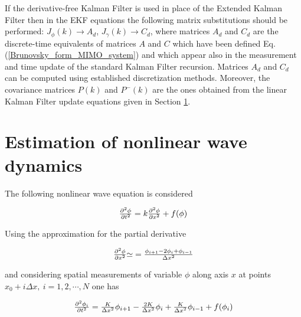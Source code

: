 \documentclass[journal]{IEEEtran}
\begin{document}
\noindent If the derivative-free Kalman Filter is used in place of the Extended Kalman Filter then in the EKF equations the following matrix substitutions should be performed: $J_{\phi}(k){\rightarrow}A_d$, $J_{\gamma}(k){\rightarrow}C_d$, where  matrices $A_d$ and $C_d$ are the discrete-time equivalents of matrices $A$ and $C$ which have been defined Eq. (\ref{Brunovsky_form_MIMO_system}) and which appear also in the measurement and time update of the standard Kalman Filter recursion. Matrices $A_d$ and $C_d$ can be computed using established discretization methods. Moreover, the covariance matrices $P(k)$ and $P^{-}(k)$ are the ones obtained from the linear Kalman Filter update equations given in Section \ref{Section 3: Estimation_of_nonlinear_wave_equations}.\\

\section{Estimation of nonlinear wave dynamics} \label{Section 3: Estimation_of_nonlinear_wave_equations}

\noindent The following nonlinear wave equation is considered

\begin{equation} \label{nonlinear_wave_equation}
\begin{tabular}{c}
${{{{\partial}^2}\phi} \over {{\partial}t^2}}=k{{{{\partial}^2}\phi} \over {{\partial}x^2}}+f(\phi)$
\end{tabular}
\end{equation}

\noindent Using the approximation for the partial derivative

\begin{equation} \label{nonlinear_wave_eq1}
\begin{tabular}{c}
${{{{\partial}^2}\phi} \over {{\partial}x^2}}{\simeq}={{\phi_{i+1}-2{\phi_i}+{\phi}_{i-1}} \over {{\Delta}x^2}}$
\end{tabular}
\end{equation}

\noindent and considering spatial measurements of variable $\phi$ along axis $x$ at points $x_0+i{\Delta}x, \ i=1,2,\cdots,N$ one has

\begin{equation}  \label{nonlinear_wave_eq2}
\begin{tabular}{c}
${{{{\partial}^2}\phi_i} \over {{\partial}t^2}}={K \over {{\Delta}x^2}}\phi_{i+1}-{{2K} \over {{\Delta}x^2}}\phi_i+{K \over {{\Delta}x}^2}\phi_{i-1}+f(\phi_i)$
\end{tabular}
\end{equation}
\end{document}
